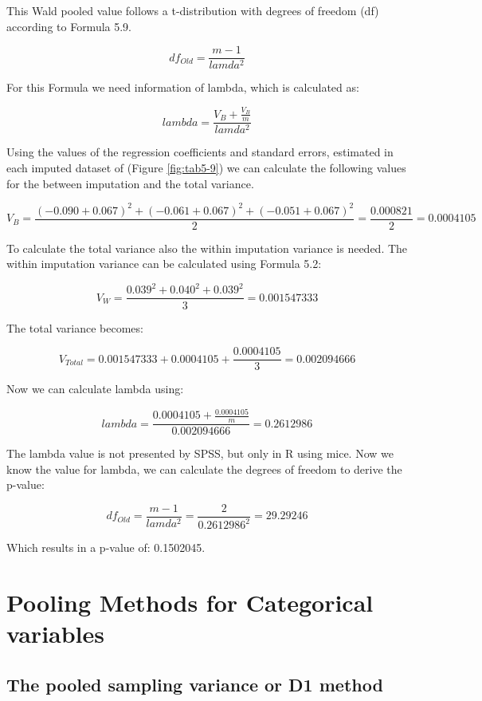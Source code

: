 \documentclass[
]{book}
\begin{document}
This Wald pooled value follows a t-distribution with degrees of freedom (df) according to Formula 5.9.

\[df_{Old} = \frac{m-1}{lamda^2}\]

For this Formula we need information of lambda, which is calculated as:

\[lambda = \frac{V_B + \frac{V_B}{m}}{lamda^2}\]

Using the values of the regression coefficients and standard errors, estimated in each imputed dataset of (Figure \ref{fig:tab5-9}) we can calculate the following values for the between imputation and the total variance.

\[V_B= \frac{(-0.090+0.067)^2 + (-0.061+0.067)^2 +(-0.051+0.067)^2}{2}=\frac{0.000821}{2}=0.0004105\]

To calculate the total variance also the within imputation variance is needed. The within imputation variance can be calculated using Formula 5.2:

\[V_W= \frac{0.039^2 + 0.040^2 + 0.039^2}{3}=0.001547333\]

The total variance becomes:

\[V_{Total} = 0.001547333+0.0004105+ \frac{0.0004105}{3}=0.002094666\]

Now we can calculate lambda using:

\[lambda = \frac{0.0004105 + \frac{0.0004105}{m}}{0.002094666}=0.2612986\]

The lambda value is not presented by SPSS, but only in R using mice. Now we know the value for lambda, we can calculate the degrees of freedom to derive the p-value:

\[df_{Old} = \frac{m-1}{lamda^2}=\frac{2}{0.2612986^2}=29.29246\]

Which results in a p-value of: 0.1502045.

\hypertarget{pooling-methods-for-categorical-variables}{%
\chapter{Pooling Methods for Categorical variables}\label{pooling-methods-for-categorical-variables}}

\hypertarget{the-pooled-sampling-variance-or-d1-method}{%
\section{The pooled sampling variance or D1 method}\label{the-pooled-sampling-variance-or-d1-method}}
\end{document}
